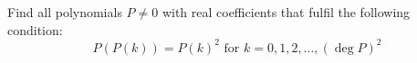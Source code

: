 Find all polynomials $P\neq 0$ with real coefficients that fulfil the following condition:
$$P(P(k))=P(k)^2 \text{ for } k=0,1,2,\dots,(\deg P)^2$$
